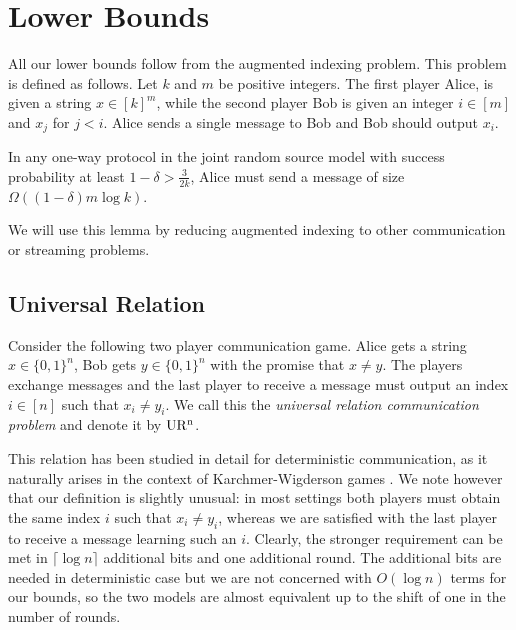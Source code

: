 \section{Lower Bounds}
\label{sec:lb}
All our lower bounds follow from the augmented indexing problem. This problem
is defined as follows. Let $k$ and $m$ be positive integers.
The first player Alice, is given a string $x\in[k]^m$, while the second player Bob
is given an integer $i\in [m]$ and $x_j$ for $j<i$. Alice sends a single
message to Bob and Bob should output $x_i$. 

\begin{lemma}
\label{lem:ai}
In any one-way protocol in the joint random source model with success
probability at least $1-\delta>\frac{3}{2k}$, Alice must send a message of
size $\Omega((1-\delta)m\log k)$.
\end{lemma}

We will use this lemma by reducing augmented indexing to other communication
or streaming problems.

%
%
\subsection{Universal Relation}\label{sec:ur}
Consider the following two player communication game.
Alice gets a string $x\in\{0,1\}^n$, Bob gets $y\in\{0,1\}^n$ with
  the promise that $x\neq y$. The players exchange 
  messages and the last player to receive a message must
   output an index $i\in [n]$ such that $x_i\neq y_i$. 
  We call this the {\em universal relation communication problem} and denote it by $\operatorname{UR^n}$.

This relation has been studied in detail for deterministic communication, as 
it naturally arises in the context of
 Karchmer-Wigderson games \cite{KarchmerWigderson}. We note however
 that our definition is slightly unusual: in most settings both players must
 obtain the same index $i$ such that $x_i\neq y_i$, whereas we are satisfied
 with the last player to receive a message learning such an $i$. Clearly, the
 stronger requirement can be met in $\lceil\log n\rceil$ additional bits and
 one additional round. The additional bits are needed in deterministic case
 but we are not concerned with $O(\log n)$ terms for our bounds, so the two
 models are almost equivalent up to the shift of one in the number of rounds.

